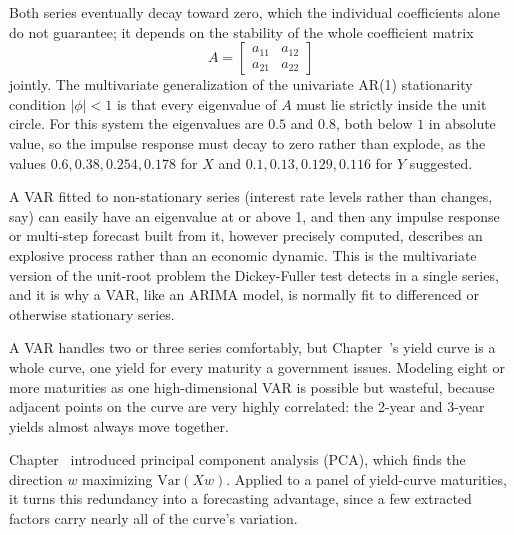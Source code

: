 \documentclass[../ai_in_finance]{subfiles}
\begin{document}
Both series eventually decay toward zero, which the individual coefficients alone do not guarantee; it depends on the stability of the whole coefficient matrix
$$A = \begin{bmatrix} a_{11} & a_{12} \\ a_{21} & a_{22} \end{bmatrix}$$
jointly. The multivariate generalization of the univariate AR(1) stationarity condition $|\phi|<1$ is that every eigenvalue of $A$ must lie strictly inside the unit circle. For this system the eigenvalues are $0.5$ and $0.8$, both below $1$ in absolute value, so the impulse response must decay to zero rather than explode, as the values $0.6, 0.38, 0.254, 0.178$ for $X$ and $0.1, 0.13, 0.129, 0.116$ for $Y$ suggested.

A VAR fitted to non-stationary series (interest rate levels rather than changes, say) can easily have an eigenvalue at or above 1, and then any impulse response or multi-step forecast built from it, however precisely computed, describes an explosive process rather than an economic dynamic. This is the multivariate version of the unit-root problem the Dickey-Fuller test detects in a single series, and it is why a VAR, like an ARIMA model, is normally fit to differenced or otherwise stationary series.

\label{sec:pca-term-structure}

A VAR handles two or three series comfortably, but Chapter~'s yield curve is a whole curve, one yield for every maturity a government issues. Modeling eight or more maturities as one high-dimensional VAR is possible but wasteful, because adjacent points on the curve are very highly correlated: the 2-year and 3-year yields almost always move together.

Chapter~ introduced principal component analysis (PCA), which finds the direction $w$ maximizing $\text{Var}(Xw)$. Applied to a panel of yield-curve maturities, it turns this redundancy into a forecasting advantage, since a few extracted factors carry nearly all of the curve's variation.
\end{document}
